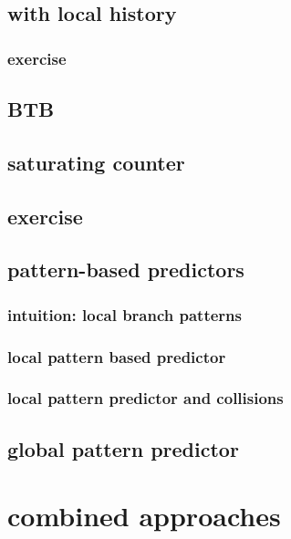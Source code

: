 
\subsection{with local history}


\subsubsection{exercise}


\subsection{BTB}


\subsection{saturating counter}


\subsection{exercise}


\subsection{pattern-based predictors}
\subsubsection{intuition: local branch patterns}

\subsubsection{local pattern based predictor}


\subsubsection{local pattern predictor and collisions}


\subsection{global pattern predictor}
 

\section{combined approaches}

